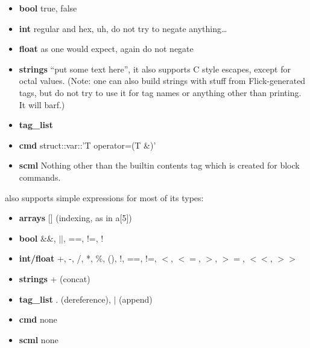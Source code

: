 \begin{itemize}
  \item \textbf{bool}
  true, false

  \item \textbf{int}
  regular and hex, uh, do not try to negate anything\ldots{}

  \item \textbf{float}
  as one would expect, again do not negate

  \item \textbf{strings} 
  ``put some text here'', it also supports C style escapes, except
  for octal values. (Note: one can also build strings
  with \CAST{} stuff from Flick-generated tags, but do not try to use
  it for tag names or anything other than printing.  It will
  barf.)

  \item \textbf{tag\_list}

  \item \textbf{cmd}
  struct::var::'T operator=(T \&)'

  \item \textbf{scml}
  Nothing other than the builtin contents tag which is created for block
  commands.
\end{itemize}

\SCML{} also supports simple expressions for most of its types:

\begin{itemize}
  \item \textbf{arrays}
  [] (indexing, as in a[5])
  
  \item \textbf{bool}
  \&\&, $||$, ==, !=, !

  \item \textbf{int/float}
  +, -, /, *, \%, (), !, ==, !=, $<$, $<=$, $>$, $>=$, $<<$, $>>$

  \item \textbf{strings}
  + (concat)

  \item \textbf{tag\_list}
  . (dereference), $|$ (append)

  \item \textbf{cmd}
  none

  \item \textbf{scml}
  none
\end{itemize}

